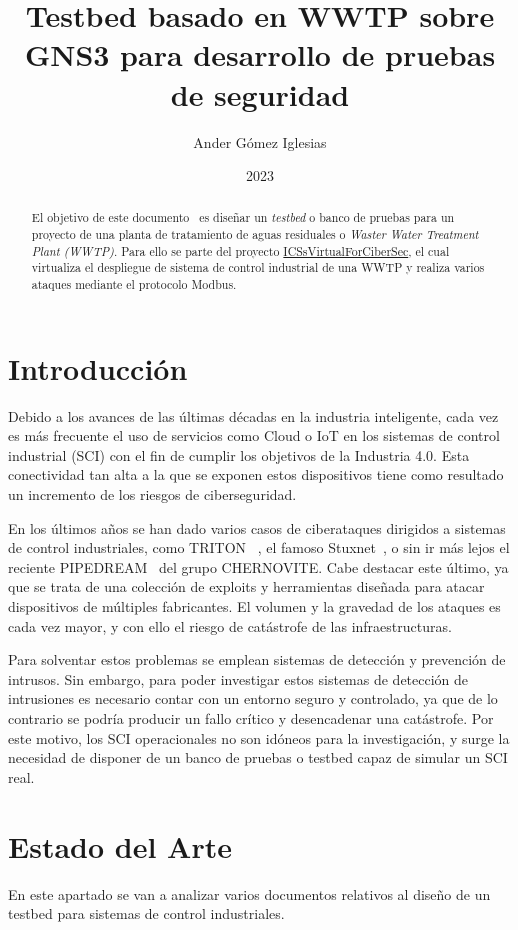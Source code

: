 \documentclass{article}
\title{Testbed basado en WWTP sobre GNS3 para desarrollo de pruebas de seguridad}
\author{Ander Gómez Iglesias}
\date{2023}
\begin{document}
\maketitle

\begin{abstract}
El objetivo de este documento~ es diseñar un \textit{testbed} o banco de pruebas para un proyecto de una planta de tratamiento de aguas residuales o \textit{Waster Water Treatment Plant (WWTP)}. Para ello se parte del proyecto \href{https://github.com/sfl0r3nz05/ICSsVirtualForCiberSec}{ICSsVirtualForCiberSec}, el cual virtualiza el despliegue de sistema de control industrial de una WWTP y realiza varios ataques mediante el protocolo Modbus.
\end{abstract}

\section{Introducción}
Debido a los avances de las últimas décadas en la industria inteligente, cada vez es más frecuente el uso de servicios como Cloud o IoT en los sistemas de control industrial (SCI) con el fin de cumplir los objetivos de la Industria 4.0. Esta conectividad tan alta a la que se exponen estos dispositivos tiene como resultado un incremento de los riesgos de ciberseguridad.

En los últimos años se han dado varios casos de ciberataques dirigidos a sistemas de control industriales, como TRITON ~\cite{triton}, el famoso Stuxnet~\cite{stuxnet}, o sin ir más lejos el reciente PIPEDREAM~\cite{dragos} del grupo CHERNOVITE. Cabe destacar este último, ya que se trata de una colección de exploits y herramientas diseñada para atacar dispositivos de múltiples fabricantes. El volumen y la gravedad de los ataques es cada vez mayor, y con ello el riesgo de catástrofe de las infraestructuras.

Para solventar estos problemas se emplean sistemas de detección y prevención de intrusos. Sin embargo, para poder investigar estos sistemas de detección de intrusiones es necesario contar con un entorno seguro y controlado, ya que de lo contrario se podría producir un fallo crítico y desencadenar una catástrofe. Por este motivo, los SCI operacionales no son idóneos para la investigación, y surge la necesidad de disponer de un banco de pruebas o testbed capaz de simular un SCI real.


\section{Estado del Arte}
En este apartado se van a analizar varios documentos relativos al diseño de un testbed para sistemas de control industriales.
\end{document}
